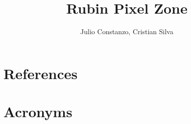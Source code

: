 \documentclass[PMO,authoryear,toc]{lsstdoc}
\title{Rubin Pixel Zone}
\author{%
Julio Constanzo, Cristian Silva
}
\date{\vcsDate}
\begin{document}
\maketitle




\appendix
\section{References} \label{sec:bib}
\renewcommand{\refname}{} %


\section{Acronyms} \label{sec:acronyms}

\end{document}
